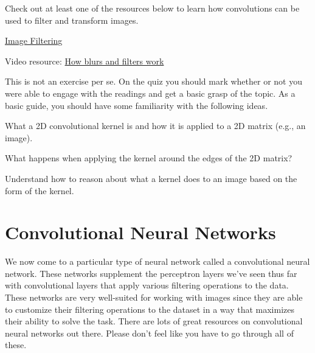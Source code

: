 \documentclass[assignment07_Solutions]{subfiles}
\begin{document}
Check out at least one of the resources below to learn how convolutions can be used to filter and transform images.

\begin{externalresources}[(30 minutes)]
\bi
\item \href{https://web.archive.org/web/20200110120140/http://machinelearninguru.com/computer_vision/basics/convolution/image_convolution_1.html}{Image Filtering}
\item Video resource: \href{https://www.youtube.com/watch?v=C_zFhWdM4ic}{How blurs and filters work}
\ei
\end{externalresources}

\begin{exercise}[(10 minutes)]
This is not an exercise per se.  On the quiz you should mark whether or not you were able to engage with the readings and get a basic grasp of the topic.  As a basic guide, you should have some familiarity with the following ideas.
\bi
\item What a 2D convolutional kernel is and how it is applied to a 2D matrix (e.g., an image).
\item What happens when applying the kernel around the edges of the 2D matrix?
\item Understand how to reason about what a kernel does to an image based on the form of the kernel.
\ei
\end{exercise}


\section{Convolutional Neural Networks}
We now come to a particular type of neural network called a convolutional neural network.  These networks supplement the perceptron layers we've seen thus far with convolutional layers that apply various filtering operations to the data.  These networks are very well-suited for working with images since they are able to customize their filtering operations to the dataset in a way that maximizes their ability to solve the task.  There are lots of great resources on convolutional neural networks out there.  Please don't feel like you have to go through all of these.
\end{document}
